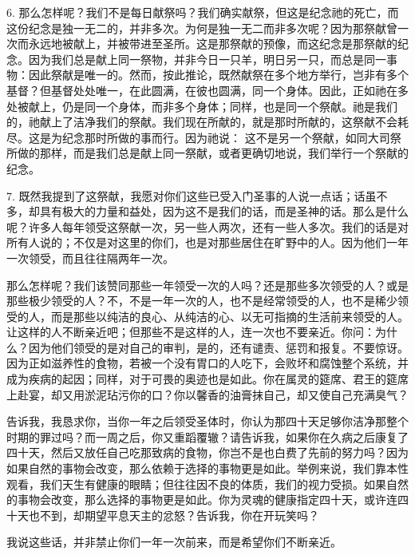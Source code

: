 6. 那么怎样呢？我们不是每日献祭吗？我们确实献祭，但这是纪念祂的死亡，而这份纪念是独一无二的，并非多次。为何是独一无二而非多次呢？因为那祭献曾一次而永远地被献上，并被带进至圣所。这是那祭献的预像，而这纪念是那祭献的纪念。因为我们总是献上同一祭物，并非今日一只羊，明日另一只，而总是同一事物：因此祭献是唯一的。然而，按此推论，既然献祭在多个地方举行，岂非有多个基督？但基督处处唯一，在此圆满，在彼也圆满，同一个身体。因此，正如祂在多处被献上，仍是同一个身体，而非多个身体；同样，也是同一个祭献。祂是我们的，祂献上了洁净我们的祭献。我们现在所献的，就是那时所献的，这祭献不会耗尽。这是为纪念那时所做的事而行。因为祂说： 这不是另一个祭献，如同大司祭所做的那样，而是我们总是献上同一祭献，或者更确切地说，我们举行一个祭献的纪念。\par

7. 既然我提到了这祭献，我愿对你们这些已受入门圣事的人说一点话；话虽不多，却具有极大的力量和益处，因为这不是我们的话，而是圣神的话。那么是什么呢？许多人每年领受这祭献一次，另一些人两次，还有一些人多次。我们的话是对所有人说的；不仅是对这里的你们，也是对那些居住在旷野中的人。因为他们一年一次领受，而且往往隔两年一次。\par

那么怎样呢？我们该赞同那些一年领受一次的人吗？还是那些多次领受的人？或是那些极少领受的人？不，不是一年一次的人，也不是经常领受的人，也不是稀少领受的人，而是那些以纯洁的良心、从纯洁的心、以无可指摘的生活前来领受的人。让这样的人不断亲近吧；但那些不是这样的人，连一次也不要亲近。你问：为什么？因为他们领受的是对自己的审判，是的，还有谴责、惩罚和报复。不要惊讶。因为正如滋养性的食物，若被一个没有胃口的人吃下，会败坏和腐蚀整个系统，并成为疾病的起因；同样，对于可畏的奥迹也是如此。你在属灵的筵席、君王的筵席上赴宴，却又用淤泥玷污你的口？你以馨香的油膏抹自己，却又使自己充满臭气？\par

告诉我，我恳求你，当你一年之后领受圣体时，你认为那四十天足够你洁净那整个时期的罪过吗？而一周之后，你又重蹈覆辙？请告诉我，如果你在久病之后康复了四十天，然后又放任自己吃那致病的食物，你岂不是也白费了先前的努力吗？因为如果自然的事物会改变，那么依赖于选择的事物更是如此。举例来说，我们靠本性观看，我们天生有健康的眼睛；但往往因不良的体质，我们的视力受损。如果自然的事物会改变，那么选择的事物更是如此。你为灵魂的健康指定四十天，或许连四十天也不到，却期望平息天主的忿怒？告诉我，你在开玩笑吗？\par

我说这些话，并非禁止你们一年一次前来，而是希望你们不断亲近。\par

